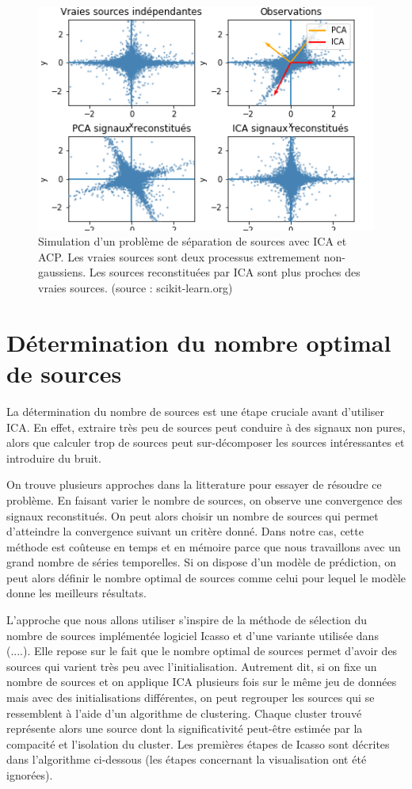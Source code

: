 \documentclass[11pt, openany]{report}
\begin{document}
\begin{figure}[H]
  \centering
  \includegraphics[width=0.6\linewidth]{ica_vs_pca.png}
  \caption{Simulation d'un problème de séparation de sources avec ICA et ACP. Les vraies sources sont deux processus extremement non-gaussiens. Les sources reconstituées par ICA sont plus proches des vraies sources. (source : scikit-learn.org)}
\end{figure}

\section{Détermination du nombre optimal de sources}
La détermination du nombre de sources est une étape cruciale avant d’utiliser ICA. En effet, extraire très peu de sources peut conduire à des signaux non pures, alors que calculer trop de sources peut sur-décomposer les sources intéressantes et introduire du bruit.

On trouve plusieurs approches dans la litterature pour essayer de résoudre ce problème. En faisant varier le nombre de sources, on observe une convergence des signaux reconstitués. On peut alors choisir un nombre de sources qui permet d'atteindre la convergence suivant un critère donné. Dans notre cas, cette méthode est coûteuse en temps et en mémoire parce que nous travaillons avec un grand nombre de séries temporelles. Si on dispose d'un modèle de prédiction, on peut alors définir le nombre optimal de sources comme celui pour lequel le modèle donne les meilleurs résultats.

L'approche que nous allons utiliser s'inspire de la méthode de sélection du nombre  de sources implémentée logiciel Icasso \cite{ICASSO} et d'une variante utilisée dans (....). Elle repose sur le fait que le nombre optimal de sources permet d'avoir des sources qui varient très peu avec l'initialisation. Autrement dit, si on fixe un nombre de sources et on applique ICA plusieurs fois sur le même jeu de données mais avec des initialisations différentes, on peut regrouper les sources qui se ressemblent à l'aide d'un algorithme de clustering. Chaque cluster trouvé représente alors une source dont la significativité peut-être estimée par la compacité et l'isolation du cluster. Les premières étapes de Icasso sont décrites dans l'algorithme ci-dessous (les étapes concernant la visualisation ont été ignorées).
\end{document}
